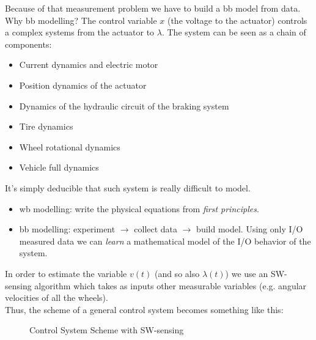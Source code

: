 Because of that measurement problem we have to build a \acrlong{bb} model from data.\\

Why \acrlong{bb} modelling?
The control variable $x$ (the voltage to the actuator) controls a complex systems from the actuator to $\lambda$.
The system can be seen as a chain of components:
\begin{itemize}
    \item Current dynamics and electric motor
    \item Position dynamics of the actuator
    \item Dynamics of the hydraulic circuit of the braking system
    \item Tire dynamics
    \item Wheel rotational dynamics
    \item Vehicle full dynamics
\end{itemize}

It's simply deducible that such system is really difficult to model.

\begin{recall}
    \hfill \break
    \begin{itemize}
	   \item \gls{wb} modelling: write the physical equations from \emph{first principles}.
	   \item \gls{bb} modelling: experiment $\rightarrow$ collect data $\rightarrow$ build model.
        Using only I/O measured data we can \emph{learn} a mathematical model of the I/O behavior of the system.
    \end{itemize}
\end{recall}

In order to estimate the variable $v(t)$ (and so also $\lambda(t)$) we use an SW-sensing algorithm which takes as inputs other measurable variables (e.g. angular velocities of all the wheels). \\
Thus, the scheme of a general control system becomes something like this: 

\begin{figure}[H]
    \centering
    \vspace{5pt}
	\caption*{Control System Scheme with SW-sensing}
\end{figure}

